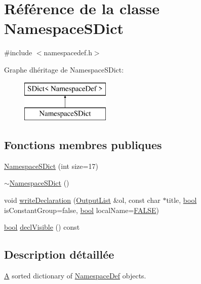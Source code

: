 \hypertarget{class_namespace_s_dict}{}\section{Référence de la classe Namespace\+S\+Dict}
\label{class_namespace_s_dict}


{\ttfamily \#include $<$namespacedef.\+h$>$}

Graphe d\textquotesingle{}héritage de Namespace\+S\+Dict\+:\begin{figure}[H]
\begin{center}
\leavevmode
\includegraphics[height=2.000000cm]{class_namespace_s_dict}
\end{center}
\end{figure}
\subsection*{Fonctions membres publiques}
\begin{DoxyCompactItemize}
\item 
\hyperlink{class_namespace_s_dict_aca50aebc3e81c2baaae42f80b1195acb}{Namespace\+S\+Dict} (int size=17)
\item 
\hyperlink{class_namespace_s_dict_aadc2c85b9e7e98f5145b1111ea2a13f9}{$\sim$\+Namespace\+S\+Dict} ()
\item 
void \hyperlink{class_namespace_s_dict_a4db0950fbb99b10f4656d385961746ca}{write\+Declaration} (\hyperlink{class_output_list}{Output\+List} \&ol, const char $\ast$title, \hyperlink{qglobal_8h_a1062901a7428fdd9c7f180f5e01ea056}{bool} is\+Constant\+Group=false, \hyperlink{qglobal_8h_a1062901a7428fdd9c7f180f5e01ea056}{bool} local\+Name=\hyperlink{qglobal_8h_a10e004b6916e78ff4ea8379be80b80cc}{F\+A\+L\+S\+E})
\item 
\hyperlink{qglobal_8h_a1062901a7428fdd9c7f180f5e01ea056}{bool} \hyperlink{class_namespace_s_dict_a653597118fcc02214327bd5440529cdf}{decl\+Visible} () const 
\end{DoxyCompactItemize}


\subsection{Description détaillée}
\hyperlink{class_a}{A} sorted dictionary of \hyperlink{class_namespace_def}{Namespace\+Def} objects. 

